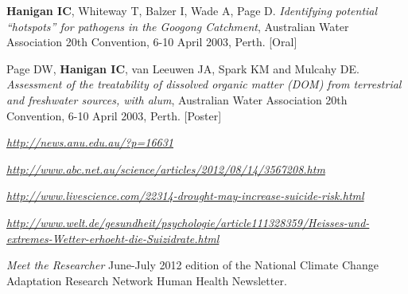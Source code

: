 \documentclass[a4paper,11pt]{article}
\begin{document}
\begin{revnumerate}
\item \textbf{Hanigan IC}, Whiteway T, Balzer I, Wade A, Page D. \emph{Identifying potential “hotspots” for pathogens in the Googong Catchment}, Australian Water Association 20th Convention, 6-10 April 2003, Perth. [Oral]

\item Page DW, \textbf{Hanigan IC}, van Leeuwen JA, Spark KM and Mulcahy DE.  \emph{Assessment of the treatability of dissolved organic matter (DOM) from terrestrial and freshwater sources, with alum}, Australian Water Association 20th Convention, 6-10 April 2003, Perth. [Poster]


\end{revnumerate}




\medskip
\renewcommand{\labelenumi}{\textsc{h}\theenumi.}
\begin{revnumerate}

\item \emph{\href{http://news.anu.edu.au/?p=16631}{http://news.anu.edu.au/?p=16631}}

\item \emph{\href{http://www.abc.net.au/science/articles/2012/08/14/3567208.htm}{http://www.abc.net.au/science/articles/2012/08/14/3567208.htm}}

\item \emph{\href{http://www.livescience.com/22314-drought-may-increase-suicide-risk.html}{http://www.livescience.com/22314-drought-may-increase-suicide-risk.html}}

\item \emph{\href{http://www.welt.de/gesundheit/psychologie/article111328359/Heisses-und-extremes-Wetter-erhoeht-die-Suizidrate.html}{http://www.welt.de/gesundheit/psychologie/article111328359/Heisses-und-extremes-Wetter-erhoeht-die-Suizidrate.html}}

\item \emph{Meet the Researcher} June-July 2012 edition of the National Climate Change Adaptation Research Network Human Health Newsletter.
\end{revnumerate}
{}
\medskip
\renewcommand{\labelenumi}{\textsc{i}\theenumi.}
\end{document}
